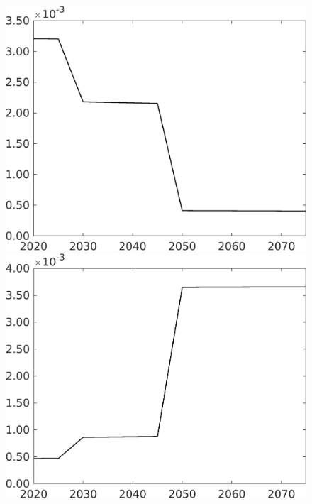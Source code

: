 \begin{figure}[h!!]
\begin{minipage}[]{0.32\textwidth}
\end{minipage}
	\begin{minipage}[]{0.32\textwidth}
	\includegraphics[width=1\textwidth]{../../codding_model/own_basedOnFried/optimalPol_elastS_DisuSci/figures/all_1705/Single_OPT_T_NoTaus_Lf_spillover0_sep1_BN0_ineq0_etaa0.79.png}
\end{minipage}
\begin{minipage}[]{0.32\textwidth}
	\includegraphics[width=1\textwidth]{../../codding_model/own_basedOnFried/optimalPol_elastS_DisuSci/figures/all_1705/Single_OPT_T_NoTaus_Lg_spillover0_sep1_BN0_ineq0_etaa0.79.png}

\end{minipage}
\end{figure}
